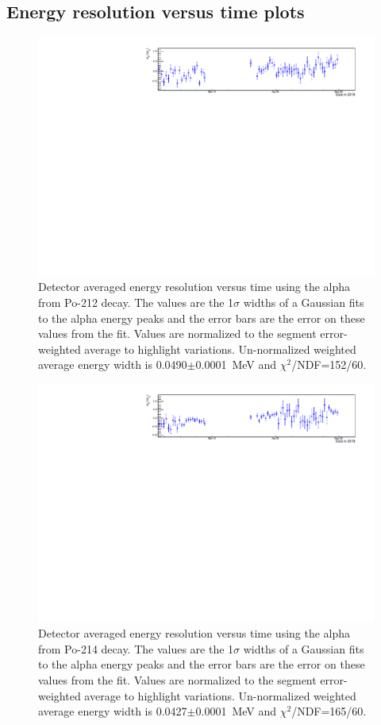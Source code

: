 \subsection{Energy resolution versus time plots}
\begin{figure}[!h]
\centering
\includegraphics[width=1.05\textwidth]{figures/PubBiPo212EresvsT.pdf}
\caption{\label{fig:EresvsT212}Detector averaged energy resolution versus time using the alpha from Po-212 decay. The values are the 1$\sigma$ widths of a Gaussian fits to the alpha energy peaks and the error bars are the error on these values from the fit. Values are normalized to the segment error-weighted average to highlight variations. Un-normalized weighted average energy width is 0.0490$\pm$0.0001~MeV and $\chi^2$/NDF=152/60.}
\end{figure}
\begin{figure}[!h]
\centering
\includegraphics[width=1.05\textwidth]{figures/PubBiPo214EresvsT.pdf}
\caption{\label{fig:EresvsT214}Detector averaged energy resolution versus time using the alpha from Po-214 decay. The values are the 1$\sigma$ widths of a Gaussian fits to the alpha energy peaks and the error bars are the error on these values from the fit. Values are normalized to the segment error-weighted average to highlight variations. Un-normalized weighted average energy width is 0.0427$\pm$0.0001~MeV and $\chi^2$/NDF=165/60.}
\end{figure}
\newpage
